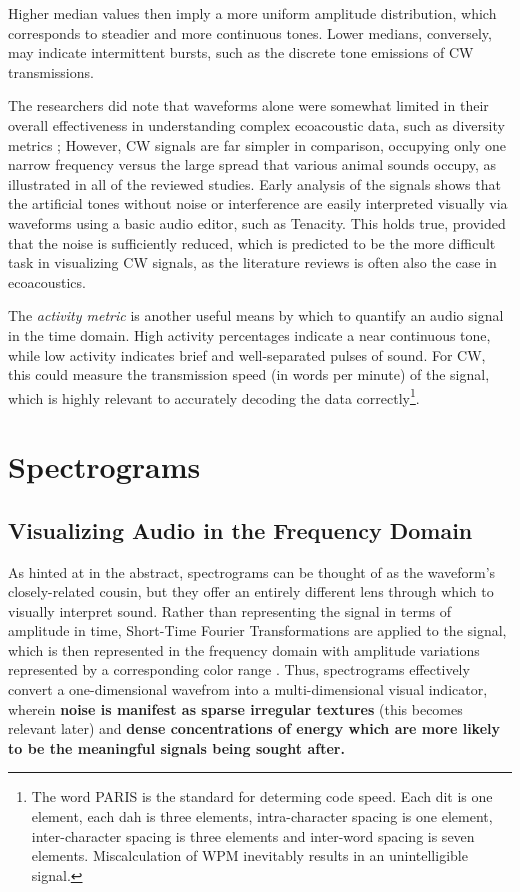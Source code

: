 \documentclass[letterpaper, 12 pt, conference]{ieeeconf}
\begin{document}
    Higher median values then imply a more uniform amplitude distribution, which corresponds to steadier and more continuous tones. Lower medians, conversely, may indicate intermittent bursts, such as the discrete tone emissions of CW transmissions.

    The researchers did note that waveforms alone were somewhat limited in their overall effectiveness in understanding complex ecoacoustic data, such as diversity metrics \autocite{Eldridge}; However, CW signals are far simpler in comparison, occupying only one narrow frequency versus the large spread that various animal sounds occupy, as illustrated in all of the reviewed studies. Early analysis of the signals shows that the artificial tones without noise or interference are easily interpreted visually via waveforms using a basic audio editor, such as Tenacity\autocite{tenacityFOSS}. This holds true, provided that the noise is sufficiently reduced, which is predicted to be the more difficult task in visualizing CW signals, as the literature reviews is often also the case in ecoacoustics.

    The \textit{activity metric} is another useful means by which to quantify an audio signal in the time domain. High activity percentages indicate a near continuous tone, while low activity indicates brief and well-separated pulses of sound. For CW, this could measure the transmission speed (in words per minute) of the signal, which is highly relevant to accurately decoding the data correctly\footnote{The word PARIS is the standard for determing code speed. Each dit is one element, each dah is three elements, intra-character spacing is one element, inter-character spacing is three elements and inter-word spacing is seven elements. Miscalculation of WPM inevitably results in an unintelligible signal.}.

\section{Spectrograms}
\subsection{Visualizing Audio in the Frequency Domain}
    As hinted at in the abstract, spectrograms can be thought of as the waveform's closely-related cousin, but they offer an entirely different lens through which to visually interpret sound. Rather than representing the signal in terms of amplitude in time, Short-Time Fourier Transformations are applied to the signal, which is then represented in the frequency domain with amplitude variations represented by a corresponding color range \autocite{zhao}. Thus, spectrograms effectively convert a one-dimensional wavefrom into a multi-dimensional visual indicator, wherein \textbf{noise is manifest as sparse irregular textures} (this becomes relevant later) and \textbf{dense concentrations of energy which are more likely to be the meaningful signals being sought after.}
\end{document}
